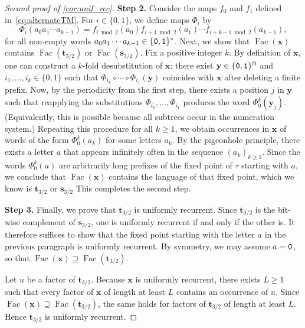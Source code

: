\documentclass[12pt,reqno]{article}
\DeclareMathOperator{\cL}{\mathrm{Fac}}
\newcommand{\cA}{\{{\tt 0},{\tt 1}\}}
\newcommand{\N}{\mathbb{N}}
\begin{document}
\begin{proof}[Second proof of \cref{cor:unif_rec}]
\textbf{Step 2.}
 Consider the maps $f_0$ and $f_1$ defined in~\eqref{eq:alternateTM}.
    For $i \in \{0,1\}$, we define maps $\Phi_i$ by
    \begin{equation}\label{eq:phii}
        \Phi_i(a_0 a_1 \cdots a_{k-1}) = f_{i\bmod{2}}(a_0) f_{{i+1}\bmod{2}}(a_1) \cdots f_{{i+k-1}\bmod{2}}(a_{k-1}),
    \end{equation}
    for all non-empty words $a_0 a_1 \cdots a_{k-1} \in \cA^*$. 
Next, we show that $\cL(\mathbf{x})$ contains $\cL(\mathbf{t}_{3/2})$ or $\cL(\mathbf{s}_{3/2})$.
Fix a positive integer $k$.
By definition of $\mathbf{x}$, one can construct a $k$-fold desubstitution of $\mathbf{x}$: there exist
$\mathbf{y} \in \{{\tt0},{\tt1}\}^\N$ and $i_1,\dots,i_k \in \{0,1\}$ such that 
$\Phi_{i_k} \circ \cdots \circ \Phi_{i_1}(\mathbf{y})$ coincides with $\mathbf{x}$ after deleting a finite prefix.
Now, by the periodicity from the first step, there exists a position $j$ in $\mathbf{y}$ such that reapplying the substitutions
$\Phi_{i_k},\dots,\Phi_{i_1}$ produces the word $\Phi_0^k(\mathbf{y}_j)$.
(Equivalently, this is possible because all subtrees occur in the numeration system.)
Repeating this procedure for all $k \ge 1$, we obtain occurrences in $\mathbf{x}$ of words of the form $\Phi_0^k(a_k)$ for some letters $a_k$.
By the pigeonhole principle, there exists a letter $a$ that appears infinitely often in the sequence $(a_k)_{k\ge 1}$.
Since the words $\Phi_0^k(a)$ are arbitrarily long prefixes of the fixed point of $\tau$ starting with $a$, we conclude that
$\cL(\mathbf{x})$ contains the language of that fixed point, which we know is $\mathbf{t}_{3/2}$ or $\mathbf{s}_{3/2}$
This completes the second step.

\textbf{Step 3.}
Finally, we prove that $\mathbf{t}_{3/2}$ is uniformly recurrent.
Since $\mathbf{t}_{3/2}$ is the bit-wise complement of $\mathbf{s}_{3/2}$, one is uniformly recurrent if and only if the other is.
It therefore suffices to show that the fixed point starting with the letter $a$ in the previous paragraph is uniformly recurrent.
By symmetry, we may assume $a = {\tt 0}$, so that $\cL(\mathbf{x}) \supseteq \cL(\mathbf{t}_{3/2})$.

Let $u$ be a factor of $\mathbf{t}_{3/2}$.
Because $\mathbf{x}$ is uniformly recurrent, there exists $L \ge 1$ such that every factor of $\mathbf{x}$ of length at least $L$ contains an occurrence of $u$.
Since $\cL(\mathbf{x}) \supseteq \cL(\mathbf{t}_{3/2})$, the same holds for factors of $\mathbf{t}_{3/2}$ of length at least $L$.
Hence $\mathbf{t}_{3/2}$ is uniformly recurrent.
\end{proof}
\end{document}
